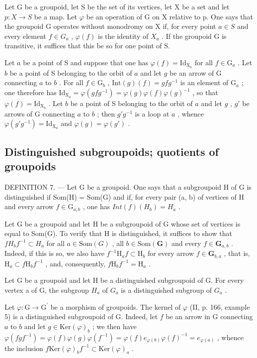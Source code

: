 Let G be a groupoid, let S be the set of its vertices, let X be a set and let \(p: X \to S\) be a map. Let \(\varphi\) be an operation of G on X relative to p. One says that the groupoid G operates without monodromy on X if, for every point \(a \in S\) and every element \(f \in G_{a}\) , \(\varphi(f)\) is the identity of \(X_{a}\) . If the groupoid G is transitive, it suffices that this be so for one point of S.

Let \(a\) be a point of S and suppose that one has \(\varphi(f) = \mathrm{Id}_{\mathrm{X}_a}\) for all \(f \in \mathrm{G}_a\) . Let \(b\) be a point of S belonging to the orbit of \(a\) and let \(g\) be an arrow of G connecting \(a\) to \(b\) . For all \(f \in \mathrm{G}_b\) , \(\mathrm{Int}(g)(f) = gfg^{-1}\) is an element of \(\mathrm{G}_a\) ; one therefore has \(\mathrm{Id}_{\mathrm{X}_a} = \varphi(gfg^{-1}) = \varphi(g)\varphi(f)\varphi(g)^{-1}\) , so that \(\varphi(f) = \mathrm{Id}_{\mathrm{X}_b}\) . Let \(b\) be a point of S belonging to the orbit of \(a\) and let \(g\) , \(g'\) be arrows of G connecting \(a\) to \(b\) ; then \(g'g^{-1}\) is a loop at \(a\) , whence \(\varphi(g'g^{-1}) = \mathrm{Id}_{\mathrm{X}_a}\) and \(\varphi(g) = \varphi(g')\) .

\subsection{Distinguished subgroupoids; quotients of groupoids}

DEFINITION 7. --- Let G be a groupoid. One says that a subgroupoid H of G is distinguished if Som(H) = Som(G) and if, for every pair (a, b) of vertices of H and every arrow \(f \in \mathrm{G}_{a,b}\) , one has \(Int(f)(H_b) = H_a\) .

Let G be a groupoid and let H be a subgroupoid of G whose set of vertices is equal to Som(G). To verify that H is distinguished, it suffices to show that \(fH_{b}f^{-1} \subset H_{a}\) for all \(a \in \text{Som}(G)\) , all \(b \in \text{Som}(\mathbf{G})\) and every \(f \in \mathbf{G}_{a,b}\) . Indeed, if this is so, we also have \(f^{-1}\mathrm{H}_a f \subset \mathrm{H}_b\) for every arrow \(f \in \mathbf{G}_{b,a}\) , that is, \(\mathrm{H}_a \subset f\mathrm{H}_b f^{-1}\) , and, consequently, \(f\mathrm{H}_b f^{-1} = \mathrm{H}_a\) .

Let G be a groupoid and let H be a distinguished subgroupoid of G. For every vertex a of G, the subgroup \(H_{a}\) of \(G_{a}\) is a distinguished subgroup of \(G_{a}\) .

Let \(\varphi\colon\mathrm{G}\to\mathrm{G}^{\prime}\) be a morphism of groupoids. The kernel of \(\varphi\) (II, p. 166, example 5) is a distinguished subgroupoid of G. Indeed, let \(f\) be an arrow in G connecting \(a\) to \(b\) and let \(g\in\mathrm{Ker}(\varphi)_{b}\) ; we then have \(\varphi(fgf^{-1})=\varphi(f)\varphi(g)\varphi(f^{-1})=\varphi(f)e_{\varphi(b)}\varphi(f)^{-1}=e_{\varphi(a)}\) , whence the inclusion \(f\mathrm{Ker}(\varphi)_{b}f^{-1}\subset\mathrm{Ker}(\varphi)_{a}\) .

